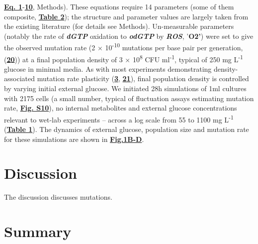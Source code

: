 \documentclass[
  12pt,
  letterpaper,
  DIV=11,
  numbers=noendperiod]{scrreprt}
\begin{document}
\href{https://www.biorxiv.org/content/10.1101/2023.09.27.557722v1.full\#disp-formula-1}{\textbf{Eq.
1}}-\href{https://www.biorxiv.org/content/10.1101/2023.09.27.557722v1.full\#disp-formula-10}{\textbf{10}},
Methods). These equations require 14 parameters (some of them composite,
\href{https://www.biorxiv.org/content/10.1101/2023.09.27.557722v1.full\#T2}{\textbf{Table
2}}); the structure and parameter values are largely taken from the
existing literature (for details see Methods). Un-measurable parameters
(notably the rate of \textbf{\emph{dGTP}} oxidation to
\textbf{\emph{odGTP}} by \textbf{\emph{ROS}}, '\textbf{O2'}) were set to
give the observed mutation rate (2 × 10\textsuperscript{-10} mutations
per base pair per generation,
(\href{https://www.biorxiv.org/content/10.1101/2023.09.27.557722v1.full\#ref-20}{\textbf{20}}))
at a final population density of 3 × 10\textsuperscript{8} CFU
ml\textsuperscript{-1}, typical of 250 mg L\textsuperscript{-1} glucose
in minimal media. As with most experiments demonstrating
density-associated mutation rate plasticity
(\href{https://www.biorxiv.org/content/10.1101/2023.09.27.557722v1.full\#ref-3}{\textbf{3}},
\href{https://www.biorxiv.org/content/10.1101/2023.09.27.557722v1.full\#ref-21}{\textbf{21}}),
final population density is controlled by varying initial external
glucose. We initiated 28h simulations of 1ml cultures with 2175 cells (a
small number, typical of fluctuation assays estimating mutation rate,
\href{https://www.biorxiv.org/content/10.1101/2023.09.27.557722v1.full\#F14}{\textbf{Fig.
S10}}), no internal metabolites and external glucose concentrations
relevant to wet-lab experiments -- across a log scale from 55 to 1100 mg
L\textsuperscript{-1}
(\href{https://www.biorxiv.org/content/10.1101/2023.09.27.557722v1.full\#T1}{\textbf{Table
1}}). The dynamics of external glucose, population size and mutation
rate for these simulations are shown in
\href{https://www.biorxiv.org/content/10.1101/2023.09.27.557722v1.full\#F1}{\textbf{Fig.1B-D}}.


\hypertarget{discussion}{%
\chapter{Discussion}\label{discussion}}

The discussion discusses mutations.


\hypertarget{summary}{%
\chapter{Summary}\label{summary}}
\end{document}
